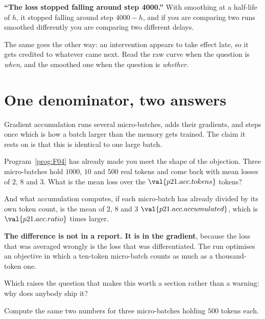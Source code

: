 \begin{fr}
\begin{trapbox}
\textbf{\enquote{The loss stopped falling around step 4000.}} With smoothing
at a half-life of $h$, it stopped falling around step $4000 - h$, and if you
are comparing two runs smoothed differently you are comparing two different
delays.

The same goes the other way: an intervention appears to take effect late, so
it gets credited to whatever came next. Read the raw curve when the question is
\emph{when}, and the smoothed one when the question is \emph{whether}.
\end{trapbox}
\end{fr}

\section{One denominator, two answers}
\label{sec:P21-accumulation}

\begin{fr}
Gradient accumulation runs several micro-batches, adds their gradients, and
steps once \dash{} which is how a batch larger than the memory gets trained.
The claim it rests on is that this is identical to one large batch.

Program~\ref{prog:F04} has already made you meet the shape of the objection.
Three micro-batches hold $1000$, $10$ and $500$ real tokens and come back with
mean losses of $2$, $8$ and $3$. What is the mean loss over the
$\val{p21.acc.tokens}$ tokens?
\dotline
\nextframe
\end{fr}

\begin{fr}
And what accumulation computes, if each micro-batch has already divided by its
own token count, is the mean of $2$, $8$ and $3$ \dash{}
$\val{p21.acc.accumulated}$, which is $\val{p21.acc.ratio}$ times larger.

\textbf{The difference is not in a report. It is in the gradient}, because the
loss that was averaged wrongly is the loss that was differentiated. The run
optimises an objective in which a ten-token micro-batch counts as much as a
thousand-token one.
\end{fr}

\begin{fr}
Which raises the question that makes this worth a section rather than a
warning: why does anybody ship it?

Compute the same two numbers for three micro-batches holding $500$ tokens
each.
\nextframe
\end{fr}

